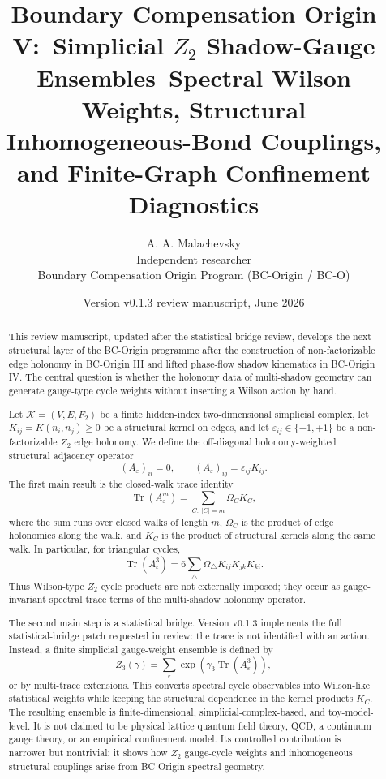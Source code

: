 \documentclass[11pt]{article}
\title{Boundary Compensation Origin V:\
\Large Simplicial $Z_2$ Shadow-Gauge Ensembles\
\large Spectral Wilson Weights, Structural Inhomogeneous-Bond Couplings, and Finite-Graph Confinement Diagnostics}
\author{A. A. Malachevsky\\
Independent researcher\\
Boundary Compensation Origin Program (BC-Origin / BC-O)}
\date{Version v0.1.3 review manuscript, June 2026}
\begin{document}
\maketitle

\begin{abstract}
This review manuscript, updated after the statistical-bridge review, develops the next structural layer of the BC-Origin programme after the construction of non-factorizable edge holonomy in BC-Origin III and lifted phase-flow shadow kinematics in BC-Origin IV. The central question is whether the holonomy data of multi-shadow geometry can generate gauge-type cycle weights without inserting a Wilson action by hand.

Let $\mathcal K=(V,E,F_2)$ be a finite hidden-index two-dimensional simplicial complex, let $K_{ij}=K(n_i,n_j)\ge 0$ be a structural kernel on edges, and let $\varepsilon_{ij}\in\{-1,+1\}$ be a non-factorizable $Z_2$ edge holonomy. We define the off-diagonal holonomy-weighted structural adjacency operator
\[
(A_\varepsilon)_{ii}=0,\qquad (A_\varepsilon)_{ij}=\varepsilon_{ij}K_{ij}.
\]
The first main result is the closed-walk trace identity
\[
\operatorname{Tr}(A_\varepsilon^m)=\sum_{C:\ |C|=m}\Omega_C K_C,
\]
where the sum runs over closed walks of length $m$, $\Omega_C$ is the product of edge holonomies along the walk, and $K_C$ is the product of structural kernels along the same walk. In particular, for triangular cycles,
\[
\operatorname{Tr}(A_\varepsilon^3)=6\sum_{\triangle}\Omega_\triangle K_{ij}K_{jk}K_{ki}.
\]
Thus Wilson-type $Z_2$ cycle products are not externally imposed; they occur as gauge-invariant spectral trace terms of the multi-shadow holonomy operator.

The second main step is a statistical bridge. Version v0.1.3 implements the full statistical-bridge patch requested in review: the trace is not identified with an action. Instead, a finite simplicial gauge-weight ensemble is defined by
\[
Z_3(\gamma)=\sum_{\varepsilon}\exp\left(\gamma_3\operatorname{Tr}(A_\varepsilon^3)\right),
\]
or by multi-trace extensions. This converts spectral cycle observables into Wilson-like statistical weights while keeping the structural dependence in the kernel products $K_C$. The resulting ensemble is finite-dimensional, simplicial-complex-based, and toy-model-level. It is not claimed to be physical lattice quantum field theory, QCD, a continuum gauge theory, or an empirical confinement model. Its controlled contribution is narrower but nontrivial: it shows how $Z_2$ gauge-cycle weights and inhomogeneous structural couplings arise from BC-Origin spectral geometry.
\end{abstract}
\end{document}
